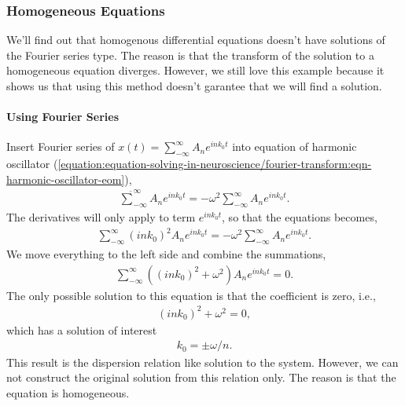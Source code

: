 \documentclass[letterpaper,10pt,english]{sphinxmanual}
\begin{document}
\subsubsection{Homogeneous Equations}
\label{\detokenize{equation-solving-in-neuroscience/fourier-transform:homogeneous-equations}}
We’ll find out that homogenous differential equations doesn’t have solutions of the Fourier series type. The reason is that the transform of the solution to a homogeneous equation diverges. However, we still love this example because it shows us that using this method doesn’t garantee that we will find a solution.


\paragraph{Using Fourier Series}
\label{\detokenize{equation-solving-in-neuroscience/fourier-transform:using-fourier-series}}
Insert Fourier series of \(x(t) = \sum_{-\infty}^{\infty} A_n e^{i n k_0 t }\) into equation of harmonic oscillator (\eqref{equation:equation-solving-in-neuroscience/fourier-transform:eqn-harmonic-oscillator-eom}),
\begin{equation*}
\begin{split}\ddot \sum_{-\infty}^{\infty} A_n e^{i n k_0 t } = - \omega^2 \sum_{-\infty}^{\infty} A_n e^{i n k_0 t }.\end{split}
\end{equation*}
The derivatives will only apply to term \(e^{i n k_0 t }\), so that the equations becomes,
\begin{equation*}
\begin{split}\sum_{-\infty}^{\infty} (i n k_0)^2 A_n e^{i n k_0 t } = - \omega^2 \sum_{-\infty}^{\infty} A_n e^{i n k_0 t }.\end{split}
\end{equation*}
We move everything to the left side and combine the summations,
\begin{equation*}
\begin{split}\sum_{-\infty}^{\infty} \left( (i n k_0)^2   +  \omega^2   \right)A_n e^{i n k_0 t } = 0.\end{split}
\end{equation*}
The only possible solution to this equation is that the coefficient is zero, i.e.,
\begin{equation*}
\begin{split}(i n k_0)^2   +  \omega^2  =0,\end{split}
\end{equation*}
which has a solution of interest
\begin{equation*}
\begin{split}k_0 =\pm \omega /n.\end{split}
\end{equation*}
This result is the dispersion relation like solution to the system. However, we can not construct the original solution from this relation only. The reason is that the equation is homogeneous.
\end{document}
